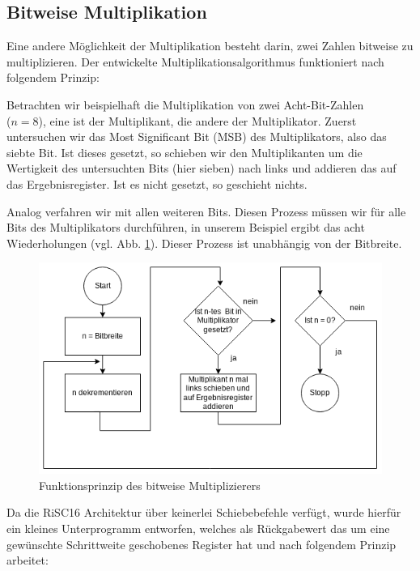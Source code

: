 \documentclass[fleqn, a4paper, 1pt]{article}       %
\begin{document}
\subsection{Bitweise Multiplikation}
Eine andere Möglichkeit der Multiplikation besteht darin, zwei Zahlen bitweise zu multiplizieren. Der entwickelte Multiplikationsalgorithmus funktioniert nach folgendem Prinzip: 

Betrachten wir beispielhaft die Multiplikation von zwei Acht-Bit-Zahlen \\ ($n = 8$), eine ist der Multiplikant, die andere der Multiplikator. Zuerst untersuchen wir das Most Significant Bit (MSB) des Multiplikators, also das siebte Bit. Ist dieses gesetzt, so schieben wir den Multiplikanten um die Wertigkeit des untersuchten Bits (hier sieben) nach links und addieren das auf das Ergebnisregister. Ist es nicht gesetzt, so geschieht nichts. \cite{MULv3}

Analog verfahren wir mit allen weiteren Bits. Diesen Prozess müssen wir für alle Bits des Multiplikators durchführen, in unserem Beispiel ergibt das acht Wiederholungen (vgl. Abb. \ref{fig:bitw_Mul_Prinzip}). Dieser Prozess ist unabhängig von der Bitbreite.



\begin{figure}[h]
    \includegraphics[width =1\textwidth]{bitweise_Mul_Prinzip.png}
\caption{Funktionsprinzip des bitweise Multiplizierers}
\label{fig:bitw_Mul_Prinzip}
\end{figure}



Da die RiSC16 Architektur über keinerlei Schiebebefehle verfügt, wurde hierfür ein kleines Unterprogramm entworfen, welches als Rückgabewert das um eine gewünschte Schrittweite geschobenes Register hat und nach folgendem Prinzip arbeitet:
\end{document}
